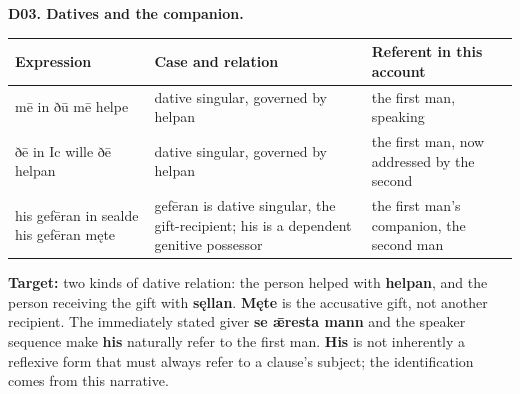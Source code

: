 \par\begin{minipage}{\linewidth}\raggedright
\textbf{D03. Datives and the companion.}

\par\begingroup
\fontsize{10.5}{13.2}\selectfont
\setlength{\LTleft}{0pt}\setlength{\LTright}{\fill}
\noindent
\begin{tabular}{@{}>{\raggedright\arraybackslash}p{28.61mm}>{\raggedright\arraybackslash}p{58.87mm}>{\raggedright\arraybackslash}p{30.89mm}@{}}
\toprule
\textbf{Expression} & \textbf{Case and relation} & \textbf{Referent in this account} \\
\midrule
mē in ðū mē helpe & dative singular, governed by helpan & the first man, speaking \\
ðē in Ic wille ðē helpan & dative singular, governed by helpan & the first man, now addressed by the second \\
his gefēran in sealde his gefēran męte & gefēran is dative singular, the gift-recipient; his is a dependent genitive possessor & the first man’s companion, the second man \\
\bottomrule
\end{tabular}
\par\endgroup

\textbf{Target:} two kinds of dative relation: the person helped with \textbf{helpan}, and the person receiving the gift with \textbf{sęllan}. \textbf{Męte} is the accusative gift, not another recipient. The immediately stated giver \textbf{se ǣresta mann} and the speaker sequence make \textbf{his} naturally refer to the first man. \textbf{His} is not inherently a reflexive form that must always refer to a clause’s subject; the identification comes from this narrative.

\end{minipage}\par\addvspace{4pt}

